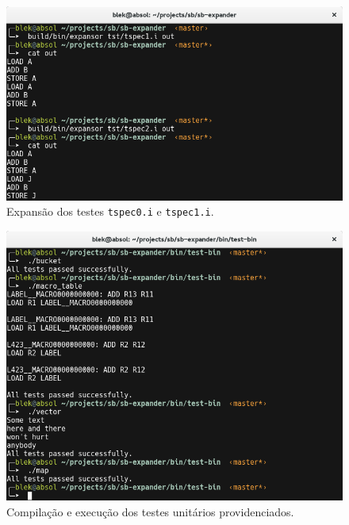 \documentclass[12pt,a4paper]{article}
\numberwithin{equation}{section}
\begin{document}
\begin{figure}[h]
    \includegraphics[scale=0.7]{imagens/tspec01.png}
    \centering
    \caption{Expansão dos testes \verb|tspec0.i| e \verb|tspec1.i|.}
\end{figure}

\begin{figure}[h]
    \includegraphics[scale=0.7]{imagens/unit-tests.png}
    \centering
    \caption{Compilação e execução dos testes unitários providenciados.}
\end{figure}

\FloatBarrier
\end{document}
